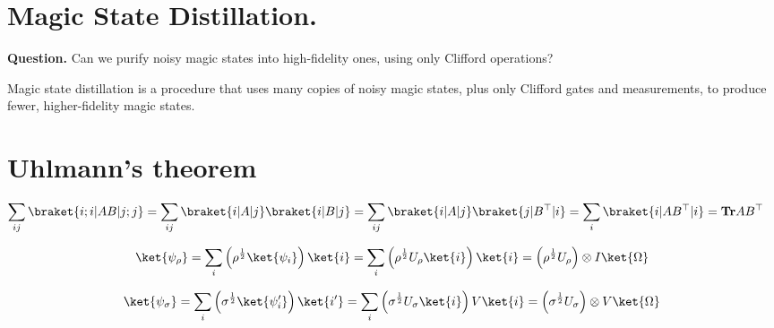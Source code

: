 \documentclass[12pt,a4paper]{article}
\begin{document}
\section{Magic State Distillation.}

\textbf{Question.} Can we purify noisy magic states into high-fidelity ones, using only Clifford operations?

Magic state distillation is a procedure that uses many copies of noisy magic states, plus only Clifford gates and measurements, to produce fewer, higher-fidelity magic states.







\section{Uhlmann's theorem}


\begin{claim}
  \begin{equation*}
    \begin{split}
      \sum_{ij}{ \braket{ i;i | AB | j ;j } } &=  \sum_{ij}{ \braket{ i| A | j} \braket{i | B | j } } =  \sum_{ij}{ \braket{ i| A | j} \braket{j | B^\top | i } } = \sum_{i}{ \braket{i | A B^\top | i } } = \mathbf{Tr} AB^\top
    \end{split}
  \end{equation*}

\end{claim}


\begin{equation*}
  \begin{split}
    \ket{\psi_\rho} = \sum_{i}{ \left( \rho^{\frac{1}{2}}\ket{\psi_i} \right) \ket{i} } = \sum_{i}{ \left( \rho^{\frac{1}{2}} U_{\rho} \ket{i} \right) \ket{i} }  =  \left( \rho^{\frac{1}{2}} U_{\rho} \right) \otimes I \ket{ \Omega } \\ 
  \end{split}
\end{equation*}

\begin{equation*}
  \begin{split}
  \ket{\psi_\sigma} = \sum_{i}{ \left( \sigma^{\frac{1}{2}}\ket{\psi^\prime_i} \right) \ket{i^\prime} } =  
  \sum_{i}{ \left( \sigma^{\frac{1}{2}} U_{\sigma} \ket{i} \right)  V \ket{i} }  =  \left( \sigma^{\frac{1}{2}} U_{\sigma} \right) \otimes V \ket{\Omega} 
  \end{split}
\end{equation*}
\end{document}
